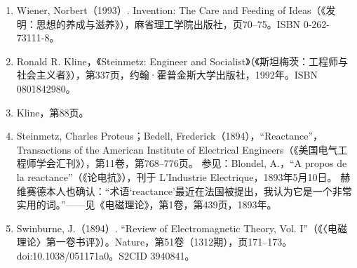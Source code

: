 \begin{enumerate}
\item Wiener, Norbert（1993）. Invention: The Care and Feeding of Ideas（《发明：思想的养成与滋养》），麻省理工学院出版社，页70–75。ISBN 0-262-73111-8。
\item Ronald R. Kline，《Steinmetz: Engineer and Socialist》（《斯坦梅茨：工程师与社会主义者》），第337页，约翰·霍普金斯大学出版社，1992年。ISBN 0801842980。
\item Kline，第88页。
\item Steinmetz, Charles Proteus；Bedell, Frederick（1894），“Reactance”，Transactions of the American Institute of Electrical Engineers（《美国电气工程师学会汇刊》），第11卷，第768–776页。
参见：Blondel, A.，“A propos de la reactance”（《论电抗》），刊于 L’Industrie Electrique，1893年5月10日。
赫维赛德本人也确认：“术语‘reactance’最近在法国被提出，我认为它是一个非常实用的词。”——见《电磁理论》，第1卷，第439页，1893年。
\item Swinburne, J.（1894）. “Review of Electromagnetic Theory, Vol. I”（《〈电磁理论〉第一卷书评》）。Nature，第51卷（1312期），页171–173。doi:10.1038/051171a0。S2CID 3940841。
\end{enumerate}